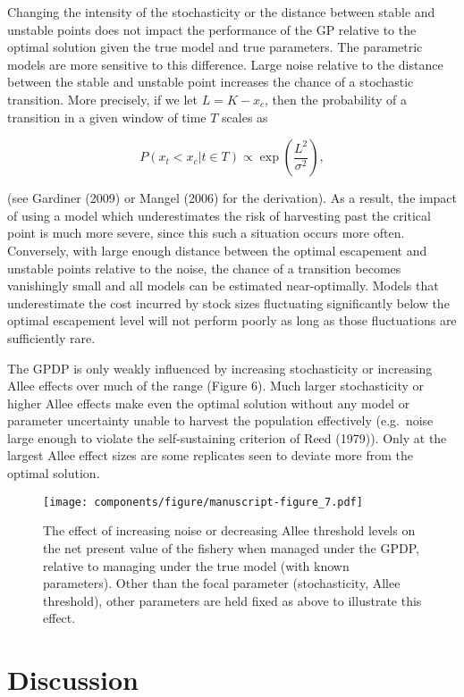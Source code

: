 \documentclass[author-year, 12pt,review]{components/elsarticle} %
\makeatletter
\def\maxwidth{\ifdim\Gin@nat@width>\linewidth\linewidth
\else\Gin@nat@width\fi}
\let\Oldincludegraphics\includegraphics
\renewcommand{\includegraphics}[1]{\Oldincludegraphics[width=\maxwidth]{#1}}
\makeatother
\begin{document}
Changing the intensity of the stochasticity or the distance between
stable and unstable points does not impact the performance of the GP
relative to the optimal solution given the true model and true
parameters. The parametric models are more sensitive to this difference.
Large noise relative to the distance between the stable and unstable
point increases the chance of a stochastic transition. More precisely,
if we let $L = K - x_c$, then the probability of a transition in a given
window of time $T$ scales as

\[P(x_t < x_c | t \in T) \propto  \exp\left(\frac{L^2}{\sigma^2}\right),\]

(see Gardiner (2009) or Mangel (2006) for the derivation). As a result,
the impact of using a model which underestimates the risk of harvesting
past the critical point is much more severe, since this such a situation
occurs more often. Conversely, with large enough distance between the
optimal escapement and unstable points relative to the noise, the chance
of a transition becomes vanishingly small and all models can be
estimated near-optimally. Models that underestimate the cost incurred by
stock sizes fluctuating significantly below the optimal escapement level
will not perform poorly as long as those fluctuations are sufficiently
rare.

The GPDP is only weakly influenced by increasing stochasticity or
increasing Allee effects over much of the range (Figure 6). Much larger
stochasticity or higher Allee effects make even the optimal solution
without any model or parameter uncertainty unable to harvest the
population effectively (e.g.~noise large enough to violate the
self-sustaining criterion of Reed (1979)). Only at the largest Allee
effect sizes are some replicates seen to deviate more from the optimal
solution.

\begin{figure}[htbp]
\centering
\texttt{[image: components/figure/manuscript-figure\_7.pdf]}
\caption{The effect of increasing noise or decreasing Allee threshold
levels on the net present value of the fishery when managed under the
GPDP, relative to managing under the true model (with known parameters).
Other than the focal parameter (stochasticity, Allee threshold), other
parameters are held fixed as above to illustrate this effect.}
\end{figure}

\section{Discussion}\label{discussion}
\end{document}
